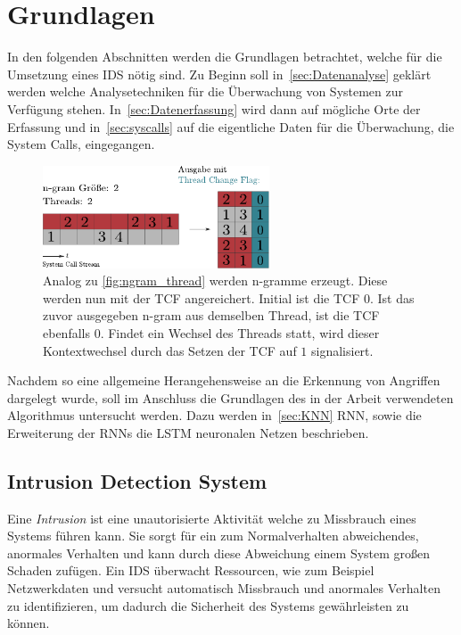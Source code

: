 \chapter{Grundlagen}\label{ch:Grundlagen}
    In den folgenden Abschnitten werden die Grundlagen betrachtet, welche für die Umsetzung eines \ac{IDS} nötig sind.
    Zu Beginn soll in~\autoref{sec:Datenanalyse} geklärt werden welche Analysetechniken für die Überwachung von Systemen zur Verfügung stehen.
    In~\autoref{sec:Datenerfassung} wird dann auf mögliche Orte der Erfassung und in~\autoref{sec:syscalls} auf die eigentliche Daten für die Überwachung, die System Calls, eingegangen.

                \begin{figure}[ht]
                    \centering
                    \includegraphics[width=0.6\textwidth]{images/tcf.pdf}
                    \caption[ass3]{Analog zu \autoref{fig:ngram_thread} werden n-gramme erzeugt.
                             Diese werden nun mit der \ac{TCF} angereichert.
                             Initial ist die \ac{TCF} $0$.
                             Ist das zuvor ausgegeben n-gram aus demselben Thread, ist die \ac{TCF} ebenfalls $0$.
                             Findet ein Wechsel des Threads statt, wird dieser Kontextwechsel durch das Setzen der \ac{TCF} auf $1$ signalisiert.}\label{fig:ngram_tcf}
                \end{figure}

    Nachdem so eine allgemeine Herangehensweise an die Erkennung von Angriffen dargelegt wurde, 
    soll im Anschluss die Grundlagen des in der Arbeit verwendeten Algorithmus untersucht werden.
    Dazu werden in~\autoref{sec:KNN} \ac{RNN}, sowie die Erweiterung der \ac{RNN}s die \ac{LSTM} neuronalen Netzen beschrieben.

    \section{Intrusion Detection System}\label{sec:IDS}
        Eine \textit{Intrusion}  ist eine unautorisierte Aktivität welche zu Missbrauch eines Systems führen kann.
        Sie sorgt für ein zum Normalverhalten abweichendes, anormales Verhalten und kann durch diese Abweichung einem System großen Schaden zufügen.
        Ein \ac{IDS} überwacht Ressourcen, wie zum Beispiel Netzwerkdaten und versucht automatisch Missbrauch und anormales Verhalten zu identifizieren, um dadurch die Sicherheit des Systems gewährleisten zu können.~\cite{IDSPIETRO2008}

